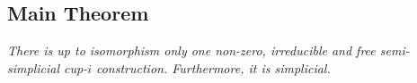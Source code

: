 \subsection{Main Theorem}\label{ss:main_theorem}

\textit{There is up to isomorphism only one non-zero, irreducible and free semi-simplicial \mbox{cup-$i$} construction.
Furthermore, it is simplicial.}


%
%
%
